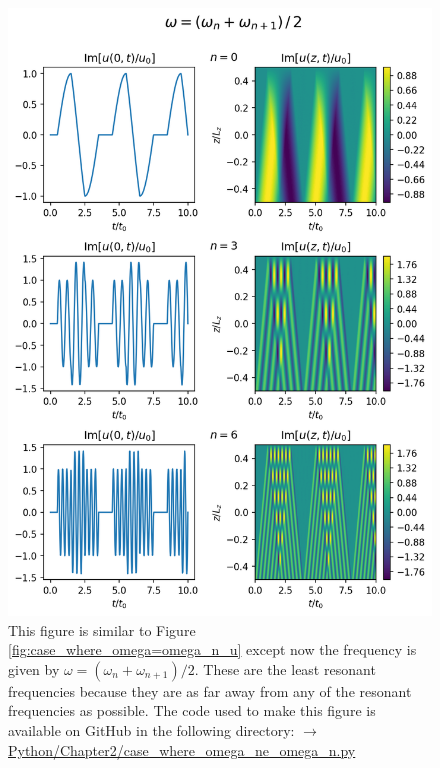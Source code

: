 \begin{figure}
    \centering
    \vspace{-20pt}
    \includegraphics[width=\textwidth,height=0.9\textheight,keepaspectratio]{figures/chapter02/case_where_omega_ne_omega_n_u.png}
    \vspace{-10pt}
    \caption{This figure is similar to Figure \ref{fig:case_where_omega=omega_n_u} except now the frequency is given by $\omega=(\omega_n+\omega_{n+1})/2$. These are the least resonant frequencies because they are as far away from any of the resonant frequencies as possible. The code used to make this figure is available on GitHub in the following directory:\newline
    \href{https://github.com/aleksyprok/apkp_thesis/blob/main/Python/Chapter2/case_where_omega_ne_omega_n.py}{$\rightarrow$ Python/Chapter2/case\_where\_omega\_ne\_omega\_n.py}}
    \vspace{-30pt}
    \label{fig:case_where_omega_ne_omega_n_u}
\end{figure}

